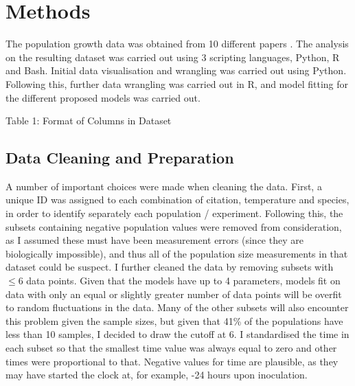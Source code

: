 \documentclass[11pt,a4wide,titlepage]{article}
\begin{document}
\section*{Methods}
The population growth data was obtained from 10 different papers \citep{baeGrowthCharacteristicsBiofilm2014a,bernhardtMetabolicTheoryTemperatureSize2018,galarzPredictingBacterialGrowth2016,gillGrowthEscherichiaColi1991,phillipsRelationTemperatureGrowth1987,rothContinuityPsychrophilicMesophilic1962,silvaModellingGrowthLactic2018,sivonenEffectsLightTemperature1990,stannardTemperatureGrowthRelationships1985,zwieteringModelingBacterialGrowth1994}. The analysis on the resulting dataset was carried out using 3 scripting languages, Python, R and Bash. Initial data visualisation and wrangling was carried out using Python. Following this, further data wrangling was carried out in R, and model fitting for the different proposed models was carried out.\newline

\begin{center}
	Table 1: Format of Columns in Dataset \newline
	\newline
\end{center}

\subsection*{Data Cleaning and Preparation}
A number of important choices were made when cleaning the data. First, a unique ID was assigned to each combination of citation, temperature and species, in order to identify separately each population / experiment. Following this, the subsets containing negative population values were removed from consideration, as I assumed these must have been measurement errors (since they are biologically impossible), and thus all of the population size measurements in that dataset could be suspect. I further cleaned the data by removing subsets with $\le 6$ data points. Given that the models have up to 4 parameters, models fit on data with only an equal or slightly greater number of data points will be overfit to random fluctuations in the data. Many of the other subsets will also encounter this problem given the sample sizes, but given that 41\% of the populations have less than 10 samples, I decided to draw the cutoff at 6. I standardised the time in each subset so that the smallest time value was always equal to zero and other times were proportional to that. Negative values for time are plausible, as they may have started the clock at, for example, -24 hours upon inoculation.
\end{document}
